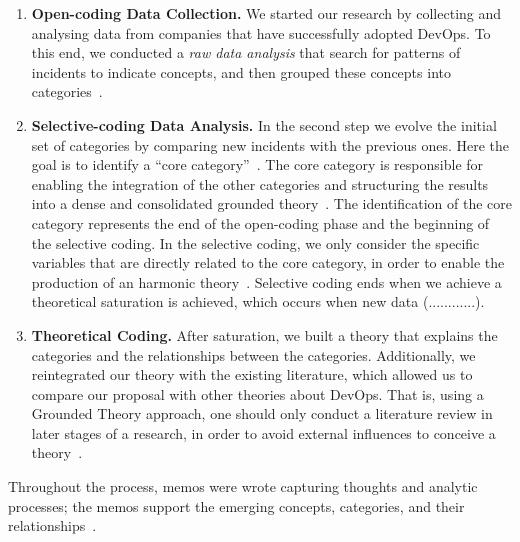 \begin{enumerate}[label=(\Alph*)]
\item {\bf Open-coding Data Collection.} We started our research 
  by collecting and analysing data from companies that have successfully adopted DevOps. 
  To this end, we conducted a \emph{raw data analysis} that search for patterns of 
  incidents to indicate concepts,  and then grouped these concepts into 
  categories~\cite{stol2016grounded}.

\item {\bf Selective-coding Data Analysis.} In the second step we evolve 
  the initial set of 
  categories by comparing new incidents with the previous ones. Here the goal is 
  to identify a ``core category''~\cite{stol2016grounded}.
  The core category is responsible for enabling the integration of the other
  categories and structuring the results into a dense and consolidated grounded
  theory~\cite{jantunen2014using}. The identification of the core category
  represents the end of the open-coding phase and the beginning of the selective coding.
  In the selective coding, we only consider the specific variables that are directly 
  related to the core category, in order to enable the production of an harmonic
  theory~\cite{coleman2007using,hoda2011impact}. Selective coding ends when we 
  achieve a theoretical saturation is achieved, {\color{red}which occurs when new data (............).}

\item {\bf Theoretical Coding.} After saturation, we built a theory that explains 
 the categories and the relationships between the categories. Additionally, we reintegrated 
 our theory with the existing literature, {\color{red}which allowed us to compare our proposal 
 with other theories about DevOps}. That is, using a Grounded Theory approach, 
 one should only conduct a literature review in later stages of a research,  
in order to avoid external influences to conceive a theory~\cite{adolph2012reconciling}.

\end{enumerate}

Throughout the process, memos were wrote capturing thoughts and analytic
processes; the memos support the emerging concepts, categories, and their
relationships~\cite{adolph2012reconciling}.



